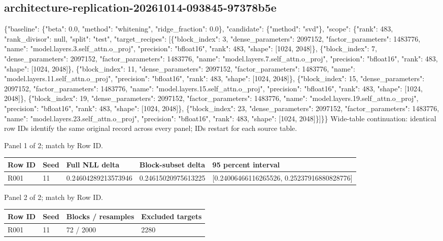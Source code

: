 \documentclass[10pt]{article}
\begin{document}
\subsection{architecture-replication-20261014-093845-97378b5e}
\{"baseline": \{"beta": 0.0, "method": "whitening", "ridge\_fraction": 0.0\}, "candidate": \{"method": "svd"\}, "scope": \{"rank": 483, "rank\_divisor": null, "split": "test", "target\_recipes": [\{"block\_index": 3, "dense\_parameters": 2097152, "factor\_parameters": 1483776, "name": "model.layers.3.self\_attn.o\_proj", "precision": "bfloat16", "rank": 483, "shape": [1024, 2048]\}, \{"block\_index": 7, "dense\_parameters": 2097152, "factor\_parameters": 1483776, "name": "model.layers.7.self\_attn.o\_proj", "precision": "bfloat16", "rank": 483, "shape": [1024, 2048]\}, \{"block\_index": 11, "dense\_parameters": 2097152, "factor\_parameters": 1483776, "name": "model.layers.11.self\_attn.o\_proj", "precision": "bfloat16", "rank": 483, "shape": [1024, 2048]\}, \{"block\_index": 15, "dense\_parameters": 2097152, "factor\_parameters": 1483776, "name": "model.layers.15.self\_attn.o\_proj", "precision": "bfloat16", "rank": 483, "shape": [1024, 2048]\}, \{"block\_index": 19, "dense\_parameters": 2097152, "factor\_parameters": 1483776, "name": "model.layers.19.self\_attn.o\_proj", "precision": "bfloat16", "rank": 483, "shape": [1024, 2048]\}, \{"block\_index": 23, "dense\_parameters": 2097152, "factor\_parameters": 1483776, "name": "model.layers.23.self\_attn.o\_proj", "precision": "bfloat16", "rank": 483, "shape": [1024, 2048]\}]\}\}
Wide-table continuation: identical row IDs identify the same original record across every panel; IDs restart for each source table.
\par\noindent Panel 1 of 2; match by Row ID.
{\scriptsize\setlength{\tabcolsep}{2pt}
\begin{longtable}{p{}p{}p{}p{}p{}}
Row ID & Seed & Full NLL delta & Block-subset delta & 95 percent interval \\
\hline\endhead
R001 & 11 & 0.24604289213573946 & 0.24615020975613225 & [0.24006466116265526, 0.25237916880828776] \\
\end{longtable}}
\par\noindent Panel 2 of 2; match by Row ID.
{\scriptsize\setlength{\tabcolsep}{2pt}
\begin{longtable}{p{}p{}p{}p{}}
Row ID & Seed & Blocks / resamples & Excluded targets \\
\hline\endhead
R001 & 11 & 72 / 2000 & 2280 \\
\end{longtable}}
\end{document}
